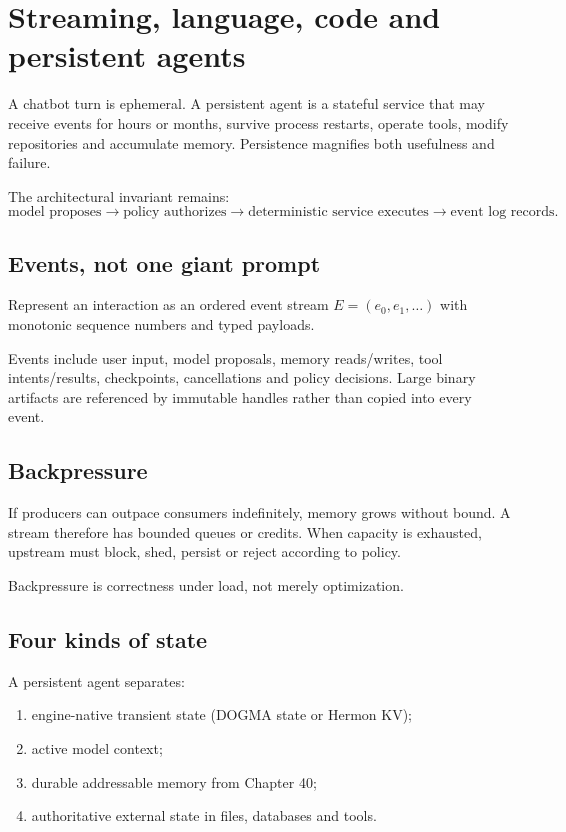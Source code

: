 \chapter{Streaming, language, code and persistent agents}

A chatbot turn is ephemeral. A persistent agent is a stateful service that may receive events for hours or months, survive process restarts, operate tools, modify repositories and accumulate memory. Persistence magnifies both usefulness and failure.

The architectural invariant remains:
\[
\boxed{\text{model proposes}\rightarrow\text{policy authorizes}\rightarrow\text{deterministic service executes}\rightarrow\text{event log records}.}
\]

\section{Events, not one giant prompt}
Represent an interaction as an ordered event stream $E=(e_0,e_1,\ldots)$ with monotonic sequence numbers and typed payloads.

Events include user input, model proposals, memory reads/writes, tool intents/results, checkpoints, cancellations and policy decisions. Large binary artifacts are referenced by immutable handles rather than copied into every event.

\section{Backpressure}
If producers can outpace consumers indefinitely, memory grows without bound. A stream therefore has bounded queues or credits. When capacity is exhausted, upstream must block, shed, persist or reject according to policy.

Backpressure is correctness under load, not merely optimization.

\section{Four kinds of state}
A persistent agent separates:
\begin{enumerate}
\item engine-native transient state (DOGMA state or Hermon KV);
\item active model context;
\item durable addressable memory from Chapter 40;
\item authoritative external state in files, databases and tools.
\end{enumerate}

